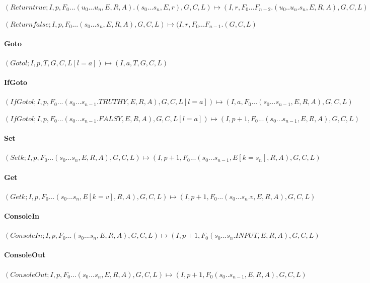 $({Return} {true}; I, p, F_0...(u_0...u_n, E, R, A).(s_0...s_n, E, r), G, C, L) \mapsto (I, r, F_0...F_{n-2}.(u_0..u_n.s_n, E, R, A), G, C, L)$

$(Return false; I, p, F_0...(s_0...s_n, E, R, A), G, C, L) \mapsto (I, r, F_0...F_{n-1}.(G, C, L)$

\paragraph{Goto}

$(Goto l; I, p, T, G, C, L[l=a]) \mapsto (I, a, T, G, C, L)$

\paragraph{IfGoto}

$(IfGoto l; I, p, F_0...(s_0...s_{n-1}.TRUTHY, E, R, A), G, C, L[l=a]) \mapsto (I, a, F_0...(s_0...s_{n-1}, E, R, A), G, C, L)$

$(IfGoto l; I, p, F_0...(s_0...s_{n-1}.FALSY, E, R, A), G, C, L[l=a]) \mapsto (I, p+1, F_0...(s_0...s_{n-1}, E, R, A), G, C, L)$

\paragraph{Set}

$(Set k; I, p, F_0...(s_0...s_n, E, R, A), G, C, L) \mapsto (I, p+1, F_0...(s_0...s_{n-1}, E[k=s_n], R, A), G, C, L)$

\paragraph{Get}

$(Get k; I, p, F_0...(s_0...s_n, E[k=v], R, A), G, C, L) \mapsto (I, p+1, F_0...(s_0...s_n.v, E, R, A), G, C, L)$

\paragraph{ConsoleIn}

$(ConsoleIn; I, p, F_0...(s_0...s_n, E, R, A), G, C, L) \mapsto (I, p+1, F_0(s_0...s_n.INPUT, E, R, A), G, C, L)$

\paragraph{ConsoleOut}

$(ConsoleOut; I, p, F_0...(s_0...s_n, E, R, A), G, C, L) \mapsto (I, p+1, F_0(s_0..s_{n-1}, E, R, A), G, C, L)$

